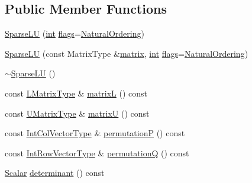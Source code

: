 \subsection*{Public Member Functions}
\begin{DoxyCompactItemize}
\item 
\hyperlink{class_sparse_l_u_3_01_matrix_type_00_01_umf_pack_01_4_a6f1e63c92a597843398f9841b1d7c12f}{Sparse\-L\-U} (\hyperlink{ioapi_8h_a787fa3cf048117ba7123753c1e74fcd6}{int} \hyperlink{class_sparse_l_u_a615b2637e9c72a9ae9ceb297f5a200ea}{flags}=\hyperlink{_sparse_util_8h_ad4a9934b75947f1fae21deee31688bb7acda9685a1ef5c7d3165275024473d9e1}{Natural\-Ordering})
\item 
\hyperlink{class_sparse_l_u_3_01_matrix_type_00_01_umf_pack_01_4_a0941fa25cbcea10ef8cfceaf51c3b394}{Sparse\-L\-U} (const Matrix\-Type \&\hyperlink{glext_8h_a7b24a3f2f56eb1244ae69dacb4fecb6f}{matrix}, \hyperlink{ioapi_8h_a787fa3cf048117ba7123753c1e74fcd6}{int} \hyperlink{class_sparse_l_u_a615b2637e9c72a9ae9ceb297f5a200ea}{flags}=\hyperlink{_sparse_util_8h_ad4a9934b75947f1fae21deee31688bb7acda9685a1ef5c7d3165275024473d9e1}{Natural\-Ordering})
\item 
\hyperlink{class_sparse_l_u_3_01_matrix_type_00_01_umf_pack_01_4_a5bbb71f160eb5cf7fbb862f9c70b217d}{$\sim$\-Sparse\-L\-U} ()
\item 
const \hyperlink{class_sparse_l_u_3_01_matrix_type_00_01_umf_pack_01_4_a2900542d2fe0efa2c2d858cd9ca9953f}{L\-Matrix\-Type} \& \hyperlink{class_sparse_l_u_3_01_matrix_type_00_01_umf_pack_01_4_aefc7d75bd620bbb79e8b36e6b52269ac}{matrix\-L} () const 
\item 
const \hyperlink{class_sparse_l_u_3_01_matrix_type_00_01_umf_pack_01_4_a22232647515b18b74cd7c1dadc5d85df}{U\-Matrix\-Type} \& \hyperlink{class_sparse_l_u_3_01_matrix_type_00_01_umf_pack_01_4_ac4a3c35da4dc69c618a78e9daf5dcaa0}{matrix\-U} () const 
\item 
const \hyperlink{class_sparse_l_u_3_01_matrix_type_00_01_umf_pack_01_4_af06161423c3dde25ec3431a7e87b66e8}{Int\-Col\-Vector\-Type} \& \hyperlink{class_sparse_l_u_3_01_matrix_type_00_01_umf_pack_01_4_a5986d394f4373e7ddb9bd6a582fe796a}{permutation\-P} () const 
\item 
const \hyperlink{class_sparse_l_u_3_01_matrix_type_00_01_umf_pack_01_4_ad6789d8ef818adc250479ca6b0d7f340}{Int\-Row\-Vector\-Type} \& \hyperlink{class_sparse_l_u_3_01_matrix_type_00_01_umf_pack_01_4_a492a9aa5383e0707508ac444d23c27ec}{permutation\-Q} () const 
\item 
\hyperlink{class_sparse_l_u_3_01_matrix_type_00_01_umf_pack_01_4_a69ffb45b1807211005457e8f787ccb45}{Scalar} \hyperlink{class_sparse_l_u_3_01_matrix_type_00_01_umf_pack_01_4_a6aa99e103c5e91a27f8563c627d9327f}{determinant} () const 

\end{DoxyCompactItemize}
